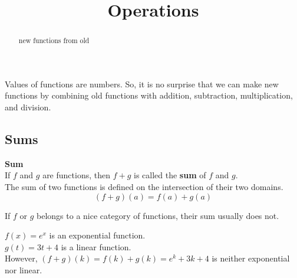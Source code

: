 \documentclass{ximera}
\title{Operations}
\begin{document}
\begin{abstract}
new functions from old
\end{abstract}
\maketitle



Values of functions are numbers.  So, it is no surprise that we can make new functions by combining old functions with addition, subtraction, multiplication, and division. \\





\subsection{Sums}


\begin{template}  \textbf{\textcolor{blue!55!black}{Sum}} \\


If  $f$ and $g$ are functions, then $f + g$ is called the \textbf{\textcolor{green!50!black}{sum}} of $f$ and $g$. \\

The sum of two functions is defined on the intersection of their two domains. \\


\[ (f + g)(a) = f(a) + g(a)  \]



\end{template}



\begin{warning}

If $f$ or $g$ belongs to a nice category of functions, their sum usually does not.

\end{warning}




\begin{example}

$f(x) = e^x$ is an exponential function. \\
$g(t) = 3 t + 4$ is a linear function. \\

However, $(f + g)(k) = f(k) + g(k) = e^k + 3 k + 4$ is neither exponential nor linear.

\end{example}
\end{document}
